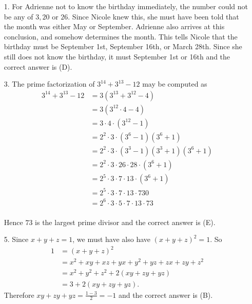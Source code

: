 \documentclass[11pt,fleqn,dvipsnames,usenames]{article}
\begin{document}
\begin{enumerate}

\item[1.] For Adrienne not to know the birthday immediately, the number could not be any of $3, 20$ or $26$.  Since Nicole knew this, she must have been told that the month was either May or September.  Adrienne also arrives at this conclusion, and somehow determines the month.  This tells Nicole that the birthday must be September 1st, September 16th, or March 28th.  Since she still does not know the birthday, it must September 1st or 16th and the correct answer is (D).


\item[3.] The prime factorization of $3^{14} + 3^{13} - 12$ may be computed as
\begin{align*}
3^{14} + 3^{13} - 12 &= 3(3^{13} + 3^{12} - 4)\\
&=  3(3^{12}\cdot 4 - 4)\\
&=  3\cdot 4\cdot (3^{12}-1)\\
&=  2^2\cdot 3\cdot(3^{6} -1)(3^{6} + 1)\\
&=  2^2\cdot 3\cdot(3^3 - 1)(3^3 + 1)(3^{6} + 1)\\
&=  2^2\cdot 3\cdot 26\cdot 28\cdot (3^{6} + 1)\\
&=  2^5\cdot 3\cdot 7\cdot 13\cdot (3^{6} + 1)\\
&=  2^5\cdot 3\cdot 7\cdot 13\cdot 730\\
&=  2^6\cdot 3\cdot 5\cdot 7\cdot 13\cdot 73\\
\end{align*}

Hence $73$ is the largest prime divisor and the correct answer is (E).

\item[5.] Since $x + y + z = 1$, we must have also have $(x + y + z)^2 = 1$.  So
\begin{align*}
1 &= (x + y + z)^2\\
&= x^2 + xy + xz + yx + y^2 + yz + zx + zy + z^2\\
&= x^2 + y^2 + z^2 + 2(xy + zy + yz)\\
&= 3 + 2(xy + zy + yz).
\end{align*}
Therefore $xy + zy + yz = \frac{1-3}{2} = -1$ and the correct answer is (B).


\end{enumerate}
\end{document}
